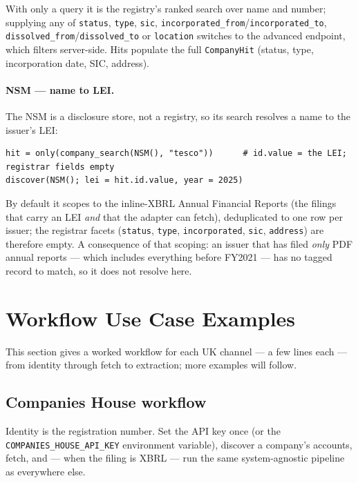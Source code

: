 \documentclass[11pt,a4paper]{report}
\begin{document}
\noindent With only a query it is the registry's ranked search over name and number; supplying any of
\texttt{status}, \texttt{type}, \texttt{sic}, \texttt{incorporated\_from}/\texttt{incorporated\_to},
\texttt{dissolved\_from}/\texttt{dissolved\_to} or \texttt{location} switches to the advanced endpoint,
which filters server-side. Hits populate the full \texttt{CompanyHit} (status, type, incorporation date,
SIC, address).

\paragraph{NSM --- name to LEI.} The NSM is a disclosure store, not a registry, so its search resolves
a name to the issuer's LEI:
\begin{lstlisting}
hit = only(company_search(NSM(), "tesco"))      # id.value = the LEI; registrar fields empty
discover(NSM(); lei = hit.id.value, year = 2025)
\end{lstlisting}

\noindent By default it scopes to the inline-XBRL Annual Financial Reports (the filings that carry an
LEI \emph{and} that the adapter can fetch), deduplicated to one row per issuer; the registrar facets
(\texttt{status}, \texttt{type}, \texttt{incorporated}, \texttt{sic}, \texttt{address}) are therefore
empty. A consequence of that scoping: an issuer that has filed \emph{only} PDF annual reports --- which
includes everything before FY2021 --- has no tagged record to match, so it does not resolve here.

\section{Workflow Use Case Examples}
\label{sec:uk-workflows}

This section gives a worked workflow for each UK channel --- a few lines each --- from identity through
fetch to extraction; more examples will follow.

\subsection{Companies House workflow}
\label{sys:companieshouse}

Identity is the registration number. Set the API key once (or the
\texttt{COMPANIES\_HOUSE\_API\_KEY} environment variable), discover a company's accounts, fetch, and
--- when the filing is XBRL --- run the same system-agnostic pipeline as everywhere else.
\end{document}
